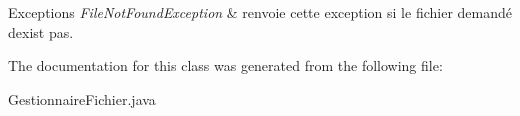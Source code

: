 \begin{DoxyExceptions}{Exceptions}
{\em File\+Not\+Found\+Exception} & renvoie cette exception si le fichier demandé d\textquotesingle{}exist pas. \\
\hline
\end{DoxyExceptions}


The documentation for this class was generated from the following file\+:\begin{DoxyCompactItemize}
\item 
Gestionnaire\+Fichier.\+java\end{DoxyCompactItemize}
